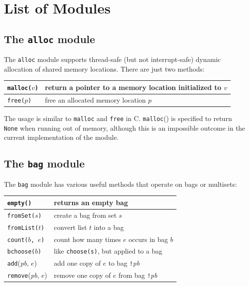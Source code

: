 \documentclass{report}
\begin{document}
\chapter{List of Modules}
\label{ap:module}

\section{The \texttt{alloc} module}

The \texttt{alloc} module
%
supports thread-safe (but not interrupt-safe) dynamic allocation of
shared memory locations.  There are just two methods:

\vspace{1em}
\begin{tabular}{|l|l|}
\hline
\texttt{malloc($v$)} & return a pointer to a memory location initialized to $v$ \\
\hline
\texttt{free($p$)} & free an allocated memory location $p$ \\
\hline
\end{tabular}
\vspace{1em}

The usage is similar to \texttt{malloc} and \texttt{free} in C.
\texttt{malloc}() is specified to return \texttt{None} when running out of
memory, although this is an impossible outcome in the current
implementation of the module.

\section{The \texttt{bag} module}
\label{ap:bag}

The \texttt{bag} module
%
has various useful methods that operate on bags or
multisets:

\vspace{1em}
\begin{tabular}{|l|l|}
\hline
\texttt{empty()} & returns an empty bag\\
\hline
\texttt{fromSet($s$)} & create a bag from set $s$\\
\hline
\texttt{fromList($t$)} & convert list $t$ into a bag \\
\hline
\texttt{count($b$, $e$)} & count how many times $e$ occurs in bag $b$\\
\hline
\texttt{bchoose($b$)} & like \texttt{choose(s)}, but applied to a bag\\
\hline
\texttt{add}(\textit{pb}, $e$) & add one copy of $e$ to bag \texttt{!}\textit{pb}\\
\hline
\texttt{remove}(\textit{pb}, $e$) & remove one copy of $e$ from bag \texttt{!}\textit{pb}\\
\hline
\end{tabular}
\end{document}
